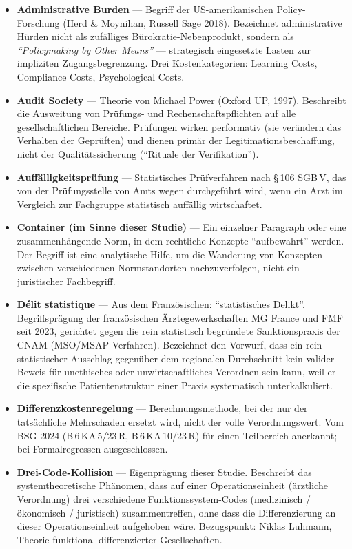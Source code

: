 \documentclass{umbruch-position}
\begin{document}
\begin{sloppypar}
\begin{itemize}[leftmargin=1em, itemsep=0.6em]
  \item \textbf{Administrative Burden} --- Begriff der US-amerikanischen Policy-Forschung (Herd \& Moynihan, Russell Sage 2018). Bezeichnet administrative Hürden nicht als zufälliges Bürokratie-Nebenprodukt, sondern als \textit{``Policymaking by Other Means''} --- strategisch eingesetzte Lasten zur impliziten Zugangsbegrenzung. Drei Kostenkategorien: Learning Costs, Compliance Costs, Psychological Costs.
  \item \textbf{Audit Society} --- Theorie von Michael Power (Oxford UP, 1997). Beschreibt die Ausweitung von Prüfungs- und Rechenschaftspflichten auf alle gesellschaftlichen Bereiche. Prüfungen wirken performativ (sie verändern das Verhalten der Geprüften) und dienen primär der Legitimationsbeschaffung, nicht der Qualitätssicherung (``Rituale der Verifikation'').
  \item \textbf{Auffälligkeitsprüfung} --- Statistisches Prüfverfahren nach \S\,106 SGB\,V, das von der Prüfungsstelle von Amts wegen durchgeführt wird, wenn ein Arzt im Vergleich zur Fachgruppe statistisch auffällig wirtschaftet.
  \item \textbf{Container (im Sinne dieser Studie)} --- Ein einzelner Paragraph oder eine zusammenhängende Norm, in dem rechtliche Konzepte ``aufbewahrt'' werden. Der Begriff ist eine analytische Hilfe, um die Wanderung von Konzepten zwischen verschiedenen Normstandorten nachzuverfolgen, nicht ein juristischer Fachbegriff.
  \item \textbf{D\'elit statistique} --- Aus dem Französischen: ``statistisches Delikt''. Begriffsprägung der französischen Ärztegewerkschaften MG France und FMF seit 2023, gerichtet gegen die rein statistisch begründete Sanktionspraxis der CNAM (MSO/MSAP-Verfahren). Bezeichnet den Vorwurf, dass ein rein statistischer Ausschlag gegenüber dem regionalen Durchschnitt kein valider Beweis für unethisches oder unwirtschaftliches Verordnen sein kann, weil er die spezifische Patientenstruktur einer Praxis systematisch unterkalkuliert.
  \item \textbf{Differenzkostenregelung} --- Berechnungsmethode, bei der nur der tatsächliche Mehrschaden ersetzt wird, nicht der volle Verordnungswert. Vom BSG 2024 (B\,6\,KA\,5/23\,R, B\,6\,KA\,10/23\,R) für einen Teilbereich anerkannt; bei Formalregressen ausgeschlossen.
  \item \textbf{Drei-Code-Kollision} --- Eigenprägung dieser Studie. Beschreibt das systemtheoretische Phänomen, dass auf einer Operationseinheit (ärztliche Verordnung) drei verschiedene Funktionssystem-Codes (medizinisch / ökonomisch / juristisch) zusammentreffen, ohne dass die Differenzierung an dieser Operationseinheit aufgehoben wäre. Bezugspunkt: Niklas Luhmann, Theorie funktional differenzierter Gesellschaften.

\end{itemize}
\end{sloppypar}
\end{document}
